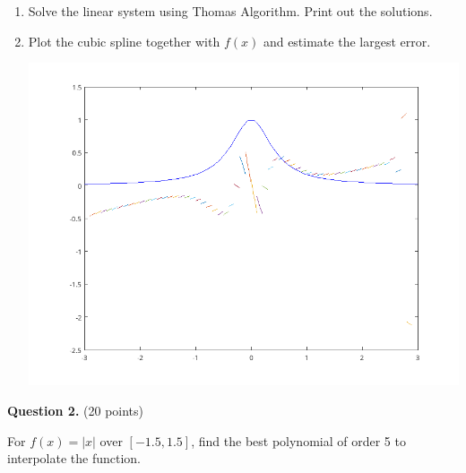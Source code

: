 \documentclass[10pt,a4paper]{report}
\begin{document}
\begin{enumerate}[label=(\alph*)]
	\item Solve the linear system using Thomas Algorithm.  Print out the solutions.
	
	
	
	\item Plot the cubic spline together with $f(x)$ and estimate the largest error.

	\includegraphics[scale=0.5]{530102a.png} 
	
\end{enumerate}

\HLINE
\noindent \textbf{Question 2.} (20 points)

For $f(x) = |x|$ over $[-1.5, 1.5]$, find the best polynomial of order 5 to interpolate the function.
\end{document}
